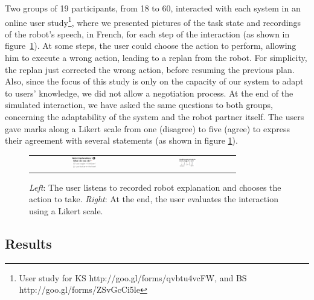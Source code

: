 Two groups of 19 participants, from 18 to 60, interacted with each system in an online user study\footnote{User study for KS http://goo.gl/forms/qvbtu4vcFW, and BS http://goo.gl/forms/ZSvGcCi5le}, where we presented pictures of the task state and recordings of the robot's speech, in French, for each step of the interaction (as shown in figure~\ref{fig:plan_management-user_study}).
At some steps, the user could choose the action to perform, allowing him to execute a wrong action, leading to a replan from the robot. For simplicity, the replan just corrected the wrong action, before resuming the previous plan. Also, since the focus of this study is only on the capacity of our system to adapt to users' knowledge, we did not allow a negotiation process.
At the end of the simulated interaction, we have asked the same questions to both groups, concerning the adaptability of the system and the robot partner itself. 
The users gave marks along a Likert scale from one (disagree) to five (agree) to express their agreement with several statements (as shown in figure \ref{fig:plan_management-user_study}).

\begin{figure}[ht!]
 \centering
 \begin{tabular}{cc}
  \includegraphics[width=0.24\textwidth]{img/plan_management/ustudy9.png} &
  \includegraphics[width=0.19\textwidth]{img/plan_management/ustudy11.png}
 \end{tabular} 
 \caption[User studies on plan adaptation]{\textit{Left}: The user listens to recorded robot explanation and chooses the action to take. \textit{Right}: At the end, the user evaluates the interaction using a Likert scale.}
 \label{fig:plan_management-user_study}
 \end{figure}

\subsection{Results}

